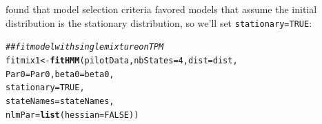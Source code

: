 \documentclass[12pt]{article}\usepackage[]{graphicx}\usepackage[]{xcolor}
\makeatletter
\newcommand{\hlnum}[1]{\textcolor[rgb]{0.686,0.059,0.569}{#1}}%
\newcommand{\hlcom}[1]{\textcolor[rgb]{0.678,0.584,0.686}{\textit{#1}}}%
\newcommand{\hldef}[1]{\textcolor[rgb]{0.345,0.345,0.345}{#1}}%
\newcommand{\hlkwb}[1]{\textcolor[rgb]{0.69,0.353,0.396}{#1}}%
\newcommand{\hlkwc}[1]{\textcolor[rgb]{0.333,0.667,0.333}{#1}}%
\newcommand{\hlkwd}[1]{\textcolor[rgb]{0.737,0.353,0.396}{\textbf{#1}}}%
\newenvironment{kframe}{%
 \def\at@end@of@kframe{}%
 \ifinner\ifhmode%
  \def\at@end@of@kframe{\end{minipage}}%
  \begin{minipage}{\columnwidth}%
 \fi\fi%
 \def\FrameCommand##1{\hskip\@totalleftmargin \hskip-\fboxsep
 \colorbox{shadecolor}{##1}\hskip-\fboxsep
     \hskip-\linewidth \hskip-\@totalleftmargin \hskip\columnwidth}%
 \MakeFramed {\advance\hsize-\width
   \@totalleftmargin\z@ \linewidth\hsize
   \@setminipage}}%
 {\par\unskip\endMakeFramed%
 \at@end@of@kframe}
\newenvironment{knitrout}{}{} %
\makeatother
\begin{document}
\noindent \cite{IsojunnoEtAl2017} found that model selection criteria favored models that assume the initial distribution is the stationary distribution, so we'll set \verb|stationary=TRUE|:
\begin{knitrout}
\color{fgcolor}\begin{kframe}
\begin{alltt}
\hlcom{## fit model with single mixture on TPM}
\hldef{fitmix1} \hlkwb{<-} \hlkwd{fitHMM}\hldef{(pilotData,} \hlkwc{nbStates}\hldef{=}\hlnum{4}\hldef{,} \hlkwc{dist}\hldef{=dist,}
                  \hlkwc{Par0}\hldef{=Par0,} \hlkwc{beta0}\hldef{=beta0,}
                  \hlkwc{stationary}\hldef{=}\hlnum{TRUE}\hldef{,}
                  \hlkwc{stateNames}\hldef{=stateNames,}
                  \hlkwc{nlmPar}\hldef{=}\hlkwd{list}\hldef{(}\hlkwc{hessian}\hldef{=}\hlnum{FALSE}\hldef{))}
\end{alltt}
\end{kframe}
\end{knitrout}
\end{document}

